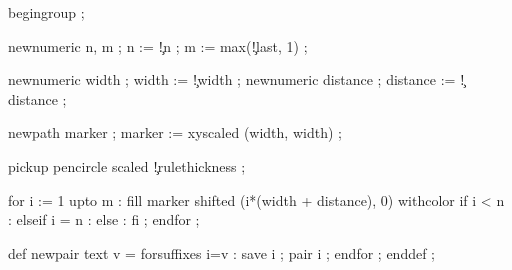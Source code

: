 


  begingroup ;

  newnumeric n, m ;
  n := \visualcounterparameter\c!n ;
  m := max(\visualcounterparameter\c!last, 1) ;

  newnumeric width    ; width    := \visualcounterparameter\c!width    ;
  newnumeric distance ; distance := \visualcounterparameter\c!distance ;

  newpath marker ;
  marker :=  %
            xyscaled (width, width) ;

  pickup pencircle scaled \visualcounterparameter\c!rulethickness ;

  for i := 1 upto m :
    fill marker shifted (i*(width + distance), 0) withcolor
          if i < n     :  
          elseif i = n : 
          else         : 
          fi ;
  endfor ;
\stopuseMPgraphic




\startMPdefinitions
  def newpair    text v = forsuffixes i=v : save i ; pair    i ; endfor ; enddef ;
\stopMPdefinitions

